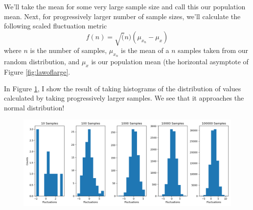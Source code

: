 \documentclass{article}
\begin{document}
We'll take the mean for some very large sample size and call this our population mean. Next, for progressively larger number of sample sizes, we'll calculate the following scaled fluctuation metric
\begin{equation}
\label{eq:14}
f(n) = \sqrt(n)(\mu_{x_n} - \mu_{x})
\end{equation}
where $n$ is the number of samples, $\mu_{x_n}$ is the mean of a $n$ samples taken from our random distribution, and $\mu_x$ is our population mean (the horizontal asymptote of Figure \ref{fig:lawoflarge}.

In Figure \ref{fig:clt}, I show the result of taking histograms of the distribution of values calculated by taking progressively larger samples. We see that it approaches the normal distribution!

\begin{figure}[htbp]
\centerline{\includegraphics[width = \textwidth]{clt.png}}
\caption[]{\label{fig:clt} }
\end{figure}
\end{document}
